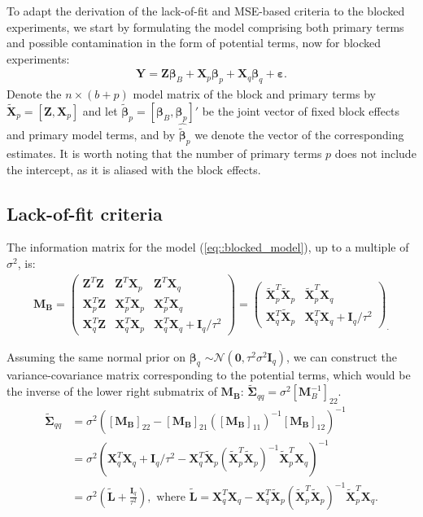 To adapt the derivation of the lack-of-fit and MSE-based criteria to the blocked experiments, we start by formulating the model comprising both primary terms and possible contamination in the form of potential terms, now for blocked experiments: 
\begin{align*}
\bm{Y}=\bm{Z\beta}_{B}+\bm{X}_{p}\bm{\beta}_{p}+\bm{X}_{q}\bm{\beta}_{q}+\bm{\varepsilon}.
\end{align*}
Denote the $n\times(b+p)$ model matrix of the block and primary terms by $\tilde{\bm{X}}_{p}=[\bm{Z},\bm{X}_{p}]$ and let $\bm{\tilde{\beta}}_p=[\bm{\beta}_{B},\bm{\beta}_{p}]'$ be the joint vector of fixed block effects and primary model terms, and by $\bm{\hat{\tilde{\beta}}}_p$ we denote the vector of the corresponding estimates. It is worth noting that the number of primary terms $p$ does not include the intercept, as it is aliased with the block effects.

\subsection{Lack-of-fit criteria}
The information matrix for the model (\ref{eq::blocked_model}), up to a multiple of $\sigma^2$, is:
\begin{align*}
\bm{M_B}=
\begin{pmatrix}
\bm{Z}^T\bm{Z} & \bm{Z}^T\bm{X}_{p} & \bm{Z}^T\bm{X}_{q}\\
\bm{X}^T_{p}\bm{Z} & \bm{X}^T_{p}\bm{X}_{p} & \bm{X}^T_{p}\bm{X}_{q}\\
\bm{X}^T_{q}\bm{Z} & \bm{X}^T_{q}\bm{X}_{p} & \bm{X}^T_{q}\bm{X}_{q}+\bm{I}_{q}/\tau^2
\end{pmatrix}
=
\begin{pmatrix}
\bm{\tilde{X}}^T_{p}\bm{\tilde{X}}_{p} & \bm{\tilde{X}}^T_{p}\bm{X}_{q}\\
\bm{X}^T_{q}\bm{\tilde{X}}_{p} & \bm{X}^T_{q}\bm{X}_{q}+\bm{I}_{q}/\tau^2
\end{pmatrix}_{.}
\end{align*} 

Assuming the same normal prior on $\bm{\beta}_q$ $\sim \mathcal{N}(\bm{0}, \tau^2\sigma^2\bm{I}_q)$, we can construct the variance-covariance matrix corresponding to the potential terms, which would be the inverse of the lower right submatrix of $\bm{M_B}$: $\bm{\tilde{\Sigma}}_{qq}=\sigma^2[\bm{M}^{-1}_B]_{22}$.
\begin{align*}
\bm{\tilde{\Sigma}}_{qq}&=\sigma^2([\bm{M_B}]_{22}-[\bm{M_B}]_{21}([\bm{M_B}]_{11})^{-1}[\bm{M_B}]_{12})^{-1}\\
&=\sigma^2(\bm{X}^T_{q}\bm{X}_{q}+\bm{I}_{q}/\tau^2-\bm{X}^T_{q}\bm{\tilde{X}}_{p}(\bm{\tilde{X}}^T_{p}\bm{\tilde{X}}_{p})^{-1}\bm{\tilde{X}}^T_{p}\bm{X}_{q})^{-1}\\&=\sigma^2\left(\bm{\tilde{L}}+\frac{\bm{I}_{q}}{\tau^2}\right), \mbox{ where }\bm{\tilde{L}}=\bm{X}^T_{q}\bm{X}_{q}-\bm{X}^T_{q}\bm{\tilde{X}}_{p}(\bm{\tilde{X}}^T_{p}\bm{\tilde{X}}_{p})^{-1}\bm{\tilde{X}}^T_{p}\bm{X}_{q}.
\end{align*}

